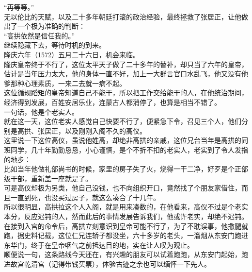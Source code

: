 \begin{multicols}{\theparacolNo}
“再等等。”\\

无以伦比的天赋，以及二十多年朝廷打滚的政治经验，最终拯救了张居正，让他做出了一个极为准确的判断：\\

“高拱依然是信任我的。”\\

继续隐藏下去，等待时机的到来。\\

隆庆六年（1572）五月二十六日，机会来临。\\

隆庆皇帝终于不行了，这位太平天子做了二十多年的替补，却只当了六年的皇帝，估计是当年压力太大，他的身体一直不好，加上一大群言官口水乱飞，他又没有他爹那种心理素质，一来二去就一病不起。\\

这位循规蹈矩的皇帝知道自己不能干，所以把工作交给能干的人，在他统治期间，经济得到发展，百姓安居乐业，连蒙古人都消停了，也算是相当不错了。\\

一句话，他是个老实人。\\

就在这一天，这位老实人感觉自己快要不行了，便紧急下令，召见三个人，他们分别是高拱、张居正，以及刚刚入阁不久的高仪。\\

这里说一下这位高仪，虽说他姓高，却绝非高拱的亲戚，这位兄台当年是高拱的同班同学，几十年勤勤恳恳，小心谨慎，是个不折不扣的老实人，老实到了令人发指的地步：\\

比如当年他做礼部尚书的时候，家里的房子失了火，烧得一干二净，好歹是个正部级干部，重新盖一座就是了。\\

可是高仪却极为另类，他自己没钱，也不向组织开口，竟然找了个朋友家借住，而且一直到死，也没买过房子，就这么凑合了十几年。\\

所以很明显，高拱拉这个人入阁，就是用来凑数的，在他看来，高仪不过是个老实本分，反应迟钝的人，然而此后的事情发展告诉我们，他或许老实，却绝不迟钝。\\

在接到入宫的命令后，高拱立刻意识到皇帝可能不行了，为了不耽误事，他撒腿就跑，据史料记载，这位仁兄连轿子都没坐，六十多岁的老头，一溜烟从东安门跑进东华门，终于在皇帝咽气之前抵达目的地，实在让人叹为观止。\\

顺便说一句，这条路线今天还在，有兴趣的朋友可以试着跑跑，从东安门起始，跑进故宫乾清宫（记得带钱买票），体验古迹之余也可以缅怀一下先人。\\


\end{multicols}
